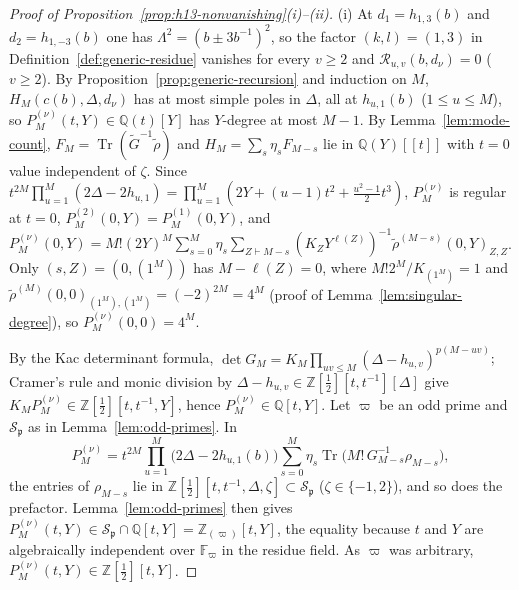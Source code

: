 \documentclass[twoside,10pt]{article}
\numberwithin{equation}{section}
\theoremstyle{slbody}
\theoremstyle{definition}
\theoremstyle{remark}
\newcommand{\Tr}{\operatorname{Tr}}
\begin{document}
\begin{proof}[Proof of Proposition~\ref{prop:h13-nonvanishing}(i)--(ii)]
(i) At \(d_1=h_{1,3}(b)\) and \(d_2=h_{1,-3}(b)\) one has
\(\Lambda^2=(b\pm3b^{-1})^2\), so the factor \((k,l)=(1,3)\) in
Definition~\ref{def:generic-residue} vanishes for every \(v\geq2\) and
\({\mathcal R}_{u,v}(b,d_\nu)=0\) (\(v\geq2\)).  By
Proposition~\ref{prop:generic-recursion} and induction on \(M\),
\(H_M(c(b),\Delta,d_\nu)\) has at most simple poles in \(\Delta\), all at
\(h_{u,1}(b)\) (\(1\leq u\leq M\)), so \(P_M^{(\nu)}(t,Y)\in\mathbb Q(t)[Y]\)
has \(Y\)-degree at most \(M-1\).
By Lemma~\ref{lem:mode-count},
\(F_M=\Tr(\widetilde G^{-1}\widetilde\rho)\) and
\(H_M=\sum_s\eta_sF_{M-s}\) lie in \(\mathbb Q(Y)[[t]]\) with \(t=0\) value
independent of \(\zeta\).  Since
\(t^{2M}\prod_{u=1}^M(2\Delta-2h_{u,1})=\prod_{u=1}^M(2Y+(u-1)t^2+\tfrac{u^2-1}{2}t^3)\),
\(P_M^{(\nu)}\) is regular at \(t=0\), \(P_M^{(2)}(0,Y)=P_M^{(1)}(0,Y)\), and
\(P_M^{(\nu)}(0,Y)=M!(2Y)^M\sum_{s=0}^M\eta_s\sum_{Z\vdash M-s}
(K_Z Y^{\ell(Z)})^{-1}\widetilde\rho^{(M-s)}(0,Y)_{Z,Z}\).
Only \((s,Z)=(0,(1^M))\) has \(M-\ell(Z)=0\), where
\(M!2^M/K_{(1^M)}=1\) and \(\widetilde\rho^{(M)}(0,0)_{(1^M),(1^M)}=(-2)^{2M}=4^M\)
(proof of Lemma~\ref{lem:singular-degree}), so \(P_M^{(\nu)}(0,0)=4^M\).

By the Kac determinant formula,
\(\det G_M=K_M\prod_{uv\leq M}(\Delta-h_{u,v})^{p(M-uv)}\); Cramer's rule and
monic division by \(\Delta-h_{u,v}\in\mathbb Z[\tfrac12][t,t^{-1}][\Delta]\) give
\(K_MP_M^{(\nu)}\in\mathbb Z[\tfrac12][t,t^{-1},Y]\), hence
\(P_M^{(\nu)}\in\mathbb Q[t,Y]\).  Let \(\varpi\) be an odd prime and
\({\mathcal S}_{\mathfrak p}\) as in Lemma~\ref{lem:odd-primes}.  In
\[
 P_M^{(\nu)}=t^{2M}\prod_{u=1}^M\bigl(2\Delta-2h_{u,1}(b)\bigr)
 \sum_{s=0}^M\eta_s\Tr\bigl(M!\,G_{M-s}^{-1}\rho_{M-s}\bigr),
\]
the entries of \(\rho_{M-s}\) lie in
\(\mathbb Z[\tfrac12][t,t^{-1},\Delta,\zeta]\subset{\mathcal S}_{\mathfrak p}\)
(\(\zeta\in\{-1,2\}\)), and so does the prefactor.  Lemma~\ref{lem:odd-primes}
then gives
\(P_M^{(\nu)}(t,Y)\in{\mathcal S}_{\mathfrak p}\cap\mathbb Q[t,Y]
=\mathbb Z_{(\varpi)}[t,Y]\), the equality because \(t\) and \(Y\) are
algebraically independent over \(\mathbb F_\varpi\) in the residue field.  As
\(\varpi\) was arbitrary, \(P_M^{(\nu)}(t,Y)\in\mathbb Z[\tfrac12][t,Y]\).


\end{proof}
\end{document}
